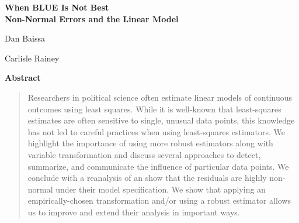 \documentclass[12pt]{article}
\begin{document}
\begin{center}
{\LARGE \textbf{When BLUE Is Not Best}}\\\vspace{2mm}
{ \textbf{Non-Normal Errors and the Linear Model}}\\\vspace{2mm}


\vspace{10mm}

Dan Baissa

\vspace{3mm}

Carlisle Rainey
\end{center}

\vspace{10mm}

{\centerline{\textbf{Abstract}}}
\begin{quote}\noindent
Researchers in political science often estimate linear models of continuous outcomes using least squares. 
While it is well-known that least-squares estimates are often sensitive to single, unusual data points, this knowledge has not led to careful practices when using least-squares estimators. 
We highlight the importance of using more robust estimators along with variable transformation and discuss several approaches to detect, summarize, and communicate the influence of particular data points. 
We conclude with a reanalysis of \cite{ClarkGolder2006} an show that the residuals are highly non-normal under their model specification. 
We show that applying an empirically-chosen transformation and/or using a robust estimator allows us to improve and extend their analysis in important ways.
 \end{quote}

\end{document}

